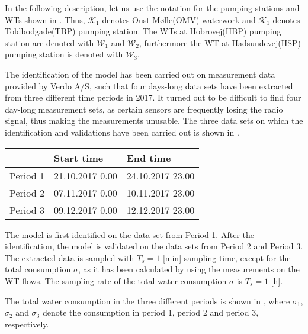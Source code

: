 In the following description, let us use the notation for the pumping stations and WTs shown in . Thus, $\mathcal{K}_1$ denotes Oust Mølle(OMV) waterwork and $\mathcal{K}_1$ denotes Toldbodgade(TBP) pumping station. The WTs at Hobrovej(HBP) pumping station are denoted with $\mathcal{W}_1$ and $\mathcal{W}_2$, furthermore the WT at Hadsundevej(HSP) pumping station is denoted with $\mathcal{W}_3$. 

The identification of the model has been carried out on measurement data provided by Verdo A/S, such that four days-long data sets have been extracted from three different time periods in 2017. It turned out to be difficult to find four day-long measurement sets, as certain sensors are frequently losing the radio signal, thus making the measurements unusable. The three data sets on which the identification and validations have been carried out is shown in .

\begin{center}
    \begin{tabular}{ | p{3cm} | p{3cm} | p{3cm} |}
    \hline
     & \textbf{Start time} & \textbf{End time} \\ 
    \hline
    Period 1 & 21.10.2017 0.00 &  24.10.2017 23.00 \\ 
    \hline
    Period 2 & 07.11.2017 0.00 & 10.11.2017 23.00  \\ 
    \hline
    Period 3 & 09.12.2017 0.00 & 12.12.2017 23.00 \\ 
    \hline
    \end{tabular}
    \label{identification_periods}
\end{center}

\vspace{-3mm}

The model is first identified on the data set from Period 1. After the identification, the model is validated on the data sets from Period 2 and Period 3. The extracted data is sampled with $T_s = 1$ [min] sampling time, except for the total consumption $\sigma$, as it has been calculated by using the measurements on the WT flows. The sampling rate of the total water consumption $\sigma$ is $T_s = 1$ [h]. 

The total water consumption in the three different periods is shown in , where $\sigma_1$, $\sigma_2$ and $\sigma_3$ denote the consumption in period 1, period 2 and period 3, respectively.

